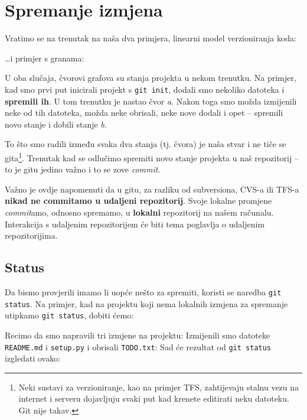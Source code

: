 \chapter*{Spremanje izmjena}

Vratimo se na trenutak na naša dva primjera, linearni model verzioniranja koda:



\dots{}i primjer s granama:



U oba slučaja, čvorovi grafova su stanja projekta u nekom trenutku.
Na primjer, kad smo prvi put inicirali projekt s \verb+git init+, dodali smo nekoliko datoteka i \textbf{spremili ih}. 
U tom trenutku je nastao čvor \emph a.
Nakon toga smo možda izmijenili neke od tih datoteka, možda neke obrisali, neke nove dodali i opet -- spremili novo stanje i dobili stanje \emph b.

To što smo radili između svaka dva stanja (tj. čvora) je naša stvar i ne tiče se gita\footnote{Neki sustavi za verzioniranje, kao na primjer TFS, zahtijevaju stalnu vezu na internet i serveru dojavljuju svaki put kad krenete editirati neku datoteku. Git nije takav.}.
Trenutak kad se odlučimo spremiti novo stanje projekta u naš repozitorij -- to je gitu jedino važno i to se zove \emph{commit}.

Važno je ovdje napomenuti da u gitu, za razliku od subversiona, CVS-a ili TFS-a \textbf{nikad ne commitamo u udaljeni repozitorij}. 
Svoje lokalne promjene \emph{commit}amo, odnosno spremamo, u \textbf{lokalni} repozitorij na našem računalu.
Interakcija s udaljenim repozitorijem će biti tema poglavlja o udaljenim repozitorijima.

\section*{Status}

Da bismo provjerili imamo li uopće nešto za spremiti, koristi se naredba \verb+git status+.
Na primjer, kad na projektu koji nema lokalnih izmjena za spremanje utipkamo \verb+git status+, dobiti ćemo:



Recimo da smo napravili tri izmjene na projektu:
Izmijenili smo datoteke \verb+README.md+ i \verb+setup.py+ i obrisali \verb+TODO.txt+:
Sad će rezultat od \verb+git status+ izgledati ovako:

